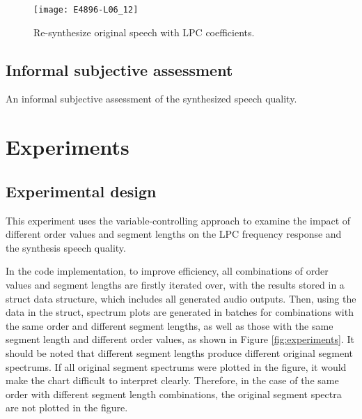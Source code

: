 \documentclass{article}
\begin{document}
\begin{figure}[ht]
\begin{center}
\texttt{[image: E4896-L06\_12]}
\end{center}
\caption{\label{fig:synthesis} Re-synthesize original speech with LPC coefficients\citep{E4896-L06}.}
\end{figure}

\subsection{Informal subjective assessment}

An informal subjective assessment of the synthesized speech quality.


\section{Experiments}

\subsection{Experimental design}

This experiment uses the variable-controlling approach to examine the impact of different order values and segment lengths on the LPC frequency response and the synthesis speech quality.

In the code implementation, to improve efficiency, all combinations of order values and segment lengths are firstly iterated over, with the results stored in a struct data structure, which includes all generated audio outputs. Then, using the data in the struct, spectrum plots are generated in batches for combinations with the same order and different segment lengths, as well as those with the same segment length and different order values, as shown in Figure \ref{fig:experiments}. It should be noted that different segment lengths produce different original segment spectrums. If all original segment spectrums were plotted in the figure, it would make the chart difficult to interpret clearly. Therefore, in the case of the same order with different segment length combinations, the original segment spectra are not plotted in the figure.
\end{document}
